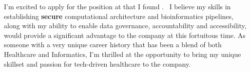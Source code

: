 



I'm excited to apply for the \position\;position at \company\;that I found \source. 
\companynews\, I believe my skills in establishing \textbf{secure} computational architecture and bioinformatics pipelines, along with my ability to enable data governance, accountability and accessibility, would provide a significant advantage to the company at this fortuitous time. As someone with a very unique career history that has been a blend of both Healthcare and Informatics, I'm thrilled at the opportunity to bring my unique skillset and passion for tech-driven healthcare to the company. 